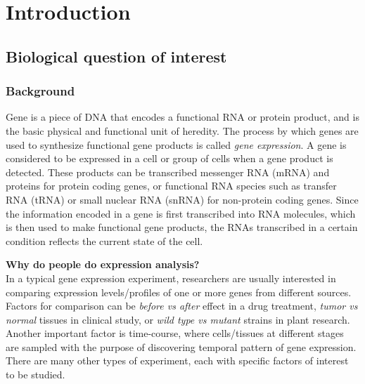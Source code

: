 \section{Introduction}\label{sec:intro}

\subsection{Biological question of interest}\label{subsec:biol}

\subsubsection{Background}

Gene is a piece of DNA that encodes a functional RNA or protein product, and is the basic physical and functional unit of heredity. The process by which genes are used to synthesize functional gene products is called \textit{gene expression}.  A gene is considered to be expressed in a cell or group of cells when a gene product is detected.
These products can be transcribed messenger RNA (mRNA) and proteins for protein coding genes, or
functional RNA species such as transfer RNA (tRNA) or small nuclear RNA (snRNA) for non-protein
coding genes.
Since the information encoded in a gene is first transcribed into RNA molecules, which is then used to make functional gene products, the RNAs transcribed
in a certain condition reflects the current state of the cell.







\textbf{Why do people do expression analysis?}\\
In a typical gene expression experiment, researchers are usually interested in comparing expression
levels/profiles of one or more genes from different sources. Factors for comparison can be
\textit{before vs
	after} effect in a drug treatment, \textit{tumor vs normal} tissues in clinical study, or
\textit{wild type vs mutant} strains in plant research. Another important factor is time-course,
where cells/tissues at different stages are sampled with the purpose of discovering temporal pattern
of gene expression. There are many other types of experiment, each with specific factors of interest
to be studied.



